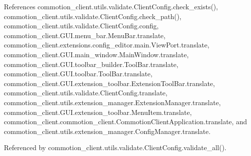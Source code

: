 References commotion\+\_\+client.\+utils.\+validate.\+Client\+Config.\+check\+\_\+exists(), commotion\+\_\+client.\+utils.\+validate.\+Client\+Config.\+check\+\_\+path(), commotion\+\_\+client.\+utils.\+validate.\+Client\+Config.\+config, commotion\+\_\+client.\+G\+U\+I.\+menu\+\_\+bar.\+Menu\+Bar.\+translate, commotion\+\_\+client.\+extensions.\+config\+\_\+editor.\+main.\+View\+Port.\+translate, commotion\+\_\+client.\+G\+U\+I.\+main\+\_\+window.\+Main\+Window.\+translate, commotion\+\_\+client.\+G\+U\+I.\+toolbar\+\_\+builder.\+Tool\+Bar.\+translate, commotion\+\_\+client.\+G\+U\+I.\+toolbar.\+Tool\+Bar.\+translate, commotion\+\_\+client.\+G\+U\+I.\+extension\+\_\+toolbar.\+Extension\+Tool\+Bar.\+translate, commotion\+\_\+client.\+utils.\+validate.\+Client\+Config.\+translate, commotion\+\_\+client.\+utils.\+extension\+\_\+manager.\+Extension\+Manager.\+translate, commotion\+\_\+client.\+G\+U\+I.\+extension\+\_\+toolbar.\+Menu\+Item.\+translate, commotion\+\_\+client.\+commotion\+\_\+client.\+Commotion\+Client\+Application.\+translate, and commotion\+\_\+client.\+utils.\+extension\+\_\+manager.\+Config\+Manager.\+translate.



Referenced by commotion\+\_\+client.\+utils.\+validate.\+Client\+Config.\+validate\+\_\+all().


